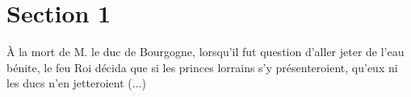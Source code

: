 \documentclass{article}
\begin{document}
\section{Section 1}

\`A la mort de M. le duc de Bourgogne, lorsqu'il fut question d'aller jeter de l'eau b\'enite, le feu Roi d\'ecida que si les princes lorrains s'y pr\'esenteroient, qu'eux ni les ducs n'en jetteroient (...)

\printindex
\end{document}
